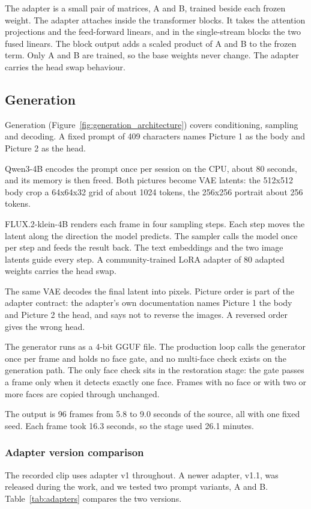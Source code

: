 The adapter is a small pair of matrices, A and B, trained beside each frozen weight. The adapter attaches inside the transformer blocks. It takes the attention projections and the feed-forward linears, and in the single-stream blocks the two fused linears. The block output adds a scaled product of A and B to the frozen term. Only A and B are trained, so the base weights never change. The adapter carries the head swap behaviour.


\subsection{Generation}
Generation (Figure~\ref{fig:generation_architecture}) covers conditioning, sampling and decoding. A fixed prompt of 409 characters names Picture 1 as the body and Picture 2 as the head.

Qwen3-4B encodes the prompt once per session on the CPU, about 80 seconds, and its memory is then freed. Both pictures become VAE latents: the 512x512 body crop a 64x64x32 grid of about 1024 tokens, the 256x256 portrait about 256 tokens.

FLUX.2-klein-4B renders each frame in four sampling steps. Each step moves the latent along the direction the model predicts. The sampler calls the model once per step and feeds the result back. The text embeddings and the two image latents guide every step. A community-trained LoRA adapter of 80 adapted weights carries the head swap.

The same VAE decodes the final latent into pixels. Picture order is part of the adapter contract: the adapter's own documentation names Picture 1 the body and Picture 2 the head, and says not to reverse the images. A reversed order gives the wrong head.

The generator runs as a 4-bit GGUF file. The production loop calls the generator once per frame and holds no face gate, and no multi-face check exists on the generation path. The only face check sits in the restoration stage: the gate passes a frame only when it detects exactly one face. Frames with no face or with two or more faces are copied through unchanged.

The output is 96 frames from 5.8 to 9.0 seconds of the source, all with one fixed seed. Each frame took 16.3 seconds, so the stage used 26.1 minutes.


\subsubsection{Adapter version comparison}
The recorded clip uses adapter v1 throughout. A newer adapter, v1.1, was released during the work, and we tested two prompt variants, A and B. Table~\ref{tab:adapters} compares the two versions.

